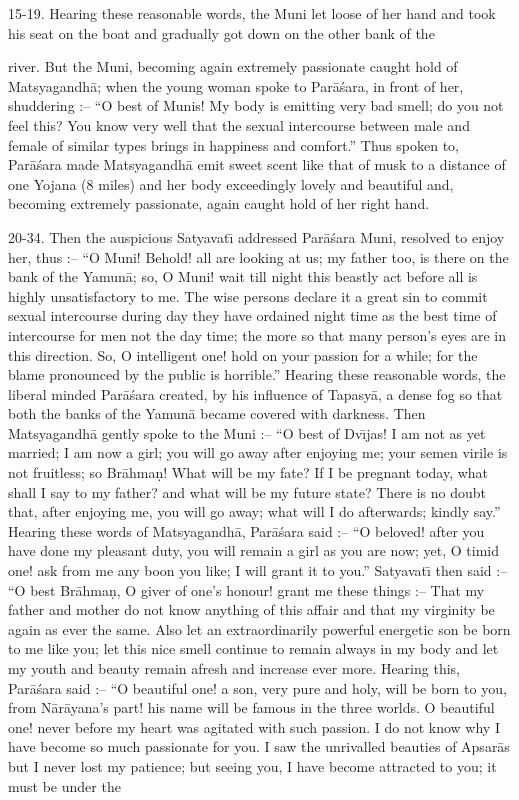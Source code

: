 15-19. Hearing these reasonable words, the Muni let loose of her hand and took his seat on the boat and gradually got down on the other bank of the

river. But the Muni, becoming again extremely passionate caught hold of Matsyagandh\=a; when the young woman spoke to Par\=a\'sara, in front of her, shuddering :-- ``O best of Munis! My body is emitting very bad smell; do you not feel this? You know very well that the sexual intercourse between male and female of similar types brings in happiness and comfort.'' Thus spoken to, Par\=a\'sara made Matsyagandh\=a emit sweet scent like that of musk to a distance of one Yojana (8 miles) and her body exceedingly lovely and beautiful and, becoming extremely passionate, again caught hold of her right hand.

20-34. Then the auspicious Satyavat\={\i} addressed Par\=a\'sara Muni, resolved to enjoy her, thus :-- ``O Muni! Behold! all are looking at us; my father too, is there on the bank of the Yamun\=a; so, O Muni! wait till night this beastly act before all is highly unsatisfactory to me. The wise persons declare it a great sin to commit sexual intercourse during day they have ordained night time as the best time of intercourse for men not the day time; the more so that many person's eyes are in this direction. So, O intelligent one! hold on your passion for a while; for the blame pronounced by the public is horrible.'' Hearing these reasonable words, the liberal minded Par\=a\'sara created, by his influence of Tapasy\=a, a dense fog so that both the banks of the Yamun\=a became covered with darkness. Then Matsyagandh\=a gently spoke to the Muni :-- ``O best of Dv\={\i}jas! I am not as yet married; I am now a girl; you will go away after enjoying me; your semen virile is not fruitless; so Br\=ahma\d{n}! What will be my fate? If I be pregnant today, what shall I say to my father? and what will be my future state? There is no doubt that, after enjoying me, you will go away; what will I do afterwards; kindly say.'' Hearing these words of Matsyagandh\=a, Par\=a\'sara said :-- ``O beloved! after you have done my pleasant duty, you will remain a girl as you are now; yet, O timid one! ask from me any boon you like; I will grant it to you.'' Satyavat\={\i} then said :-- ``O best Br\=ahma\d{n}, O giver of one's honour! grant me these things :-- That my father and mother do not know anything of this affair and that my virginity be again as ever the same. Also let an extraordinarily powerful energetic son be born to me like you; let this nice smell continue to remain always in my body and let my youth and beauty remain afresh and increase ever more. Hearing this, Par\=a\'sara said :-- ``O beautiful one! a son, very pure and holy, will be born to you, from N\=ar\=ayana's part! his name will be famous in the three worlds. O beautiful one! never before my heart was agitated with such passion. I do not know why I have become so much passionate for you. I saw the unrivalled beauties of Apsar\=as but I never lost my patience; but seeing you, I have become attracted to you; it must be under the

